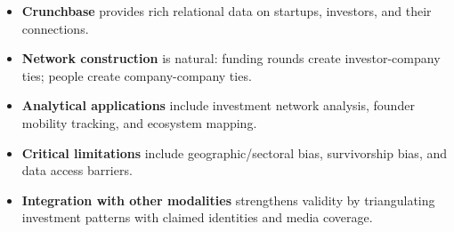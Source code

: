 \begin{summarybox}
\begin{itemize}[leftmargin=*, itemsep=0.3em]
\item \textbf{Crunchbase} provides rich relational data on startups, investors, and their connections.

\item \textbf{Network construction} is natural: funding rounds create investor-company ties; people create company-company ties.

\item \textbf{Analytical applications} include investment network analysis, founder mobility tracking, and ecosystem mapping.

\item \textbf{Critical limitations} include geographic/sectoral bias, survivorship bias, and data access barriers.

\item \textbf{Integration with other modalities} strengthens validity by triangulating investment patterns with claimed identities and media coverage.
\end{itemize}
\end{summarybox}
